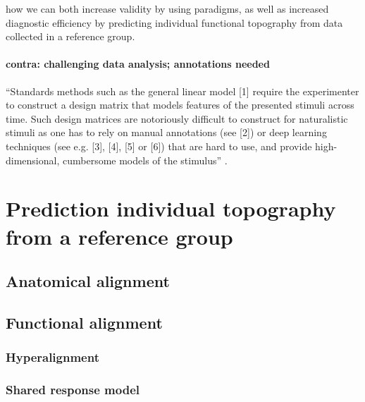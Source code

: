 how we can both increase validity by using
 paradigms, as well as increased diagnostic
efficiency by predicting individual functional topography from data collected in
a reference group.


\paragraph{contra: challenging data analysis; annotations needed}


``Standards methods such as the general linear model [1] require the
experimenter to construct a design matrix that models features of the presented
stimuli across time. Such design matrices are notoriously difficult to construct
for naturalistic stimuli as one has to rely on manual annotations (see [2]) or
deep learning techniques (see e.g. [3], [4], [5] or [6]) that are hard to use,
and provide high-dimensional, cumbersome models of the stimulus''
\citep{richard2019fast}.


\section{Prediction individual topography from a reference group}




\subsection{Anatomical alignment}



\subsection{Functional alignment}


\subsubsection{Hyperalignment}


\subsubsection{Shared response model}


